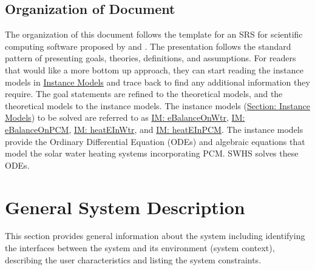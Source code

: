 \documentclass[12pt]{article}
\begin{document}
\subsection{Organization of Document}
\label{Sec:DocOrg}
The organization of this document follows the template for an SRS for scientific computing software proposed by \cite{dParnas1972} and \cite{dParnasPcClements1984}. The presentation follows the standard pattern of presenting goals, theories, definitions, and assumptions. For readers that would like a more bottom up approach, they can start reading the instance models in \hyperref[Sec:IMs]{Instance Models} and trace back to find any additional information they require.
The goal statements are refined to the theoretical models, and the theoretical models to the instance models. The instance models (\hyperref[Sec:IMs]{Section: Instance Models}) to be solved are referred to as \hyperref[IM:eBalanceOnWtr]{IM: eBalanceOnWtr}, \hyperref[IM:eBalanceOnPCM]{IM: eBalanceOnPCM}, \hyperref[IM:heatEInWtr]{IM: heatEInWtr}, and \hyperref[IM:heatEInPCM]{IM: heatEInPCM}. The instance models provide the Ordinary Differential Equation (ODEs) and algebraic equations that model the solar water heating systems incorporating PCM. SWHS solves these ODEs.
\section{General System Description}
\label{Sec:GenSysDesc}
This section provides general information about the system including identifying the interfaces between the system and its environment (system context), describing the user characteristics and listing the system constraints.
\end{document}
